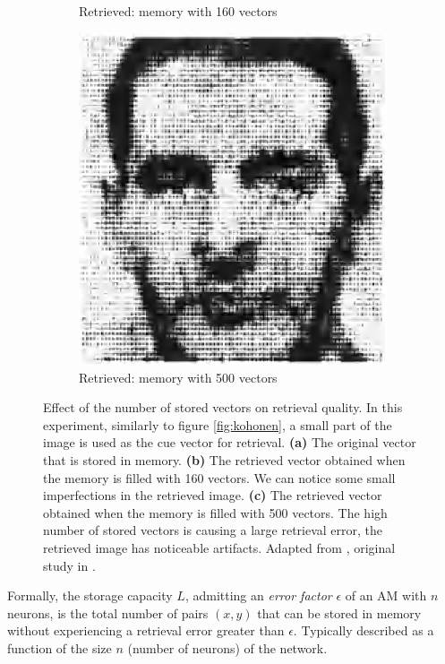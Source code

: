 \documentclass{article}
\begin{document}
\begin{figure}[htbp]
\begin{subfigure}[t]{0.3\textwidth}
         \caption{Retrieved: memory with 160 vectors}
         \label{kohonen2B}
     \end{subfigure}
     \hfill
     \begin{subfigure}[t]{0.3\textwidth}
         \centering
         \includegraphics[width=\textwidth]{img/kohonenD.png}
         \caption{Retrieved: memory with 500 vectors}
         \label{kohonen2C}
     \end{subfigure}
        \caption{Effect of the number of stored vectors on retrieval quality. In this experiment, similarly to figure \ref{fig:kohonen}, a small part of the image is used as the cue vector for retrieval. \textbf{(a)} The original vector that is stored in memory. \textbf{(b)} The retrieved vector obtained when the memory is filled with 160 vectors. We can notice some small imperfections in the retrieved image. \textbf{(c)} The retrieved vector obtained when the memory is filled with 500 vectors. The high number of stored vectors is causing a large retrieval error, the retrieved image has noticeable artifacts. Adapted from \cite{kohonen2012self}, original study in \cite{kohonen1977principle}.}
        \label{fig:kohonen2}
\end{figure}
    
Formally, the storage capacity $L$, admitting an \textit{error factor} $\epsilon$ of an AM with $n$ neurons, is the total number of pairs $(x,y)$ that can be stored in memory without experiencing a retrieval error greater than $\epsilon$. Typically described as a function of the size $n$ (number of neurons) of the network.
\end{document}
